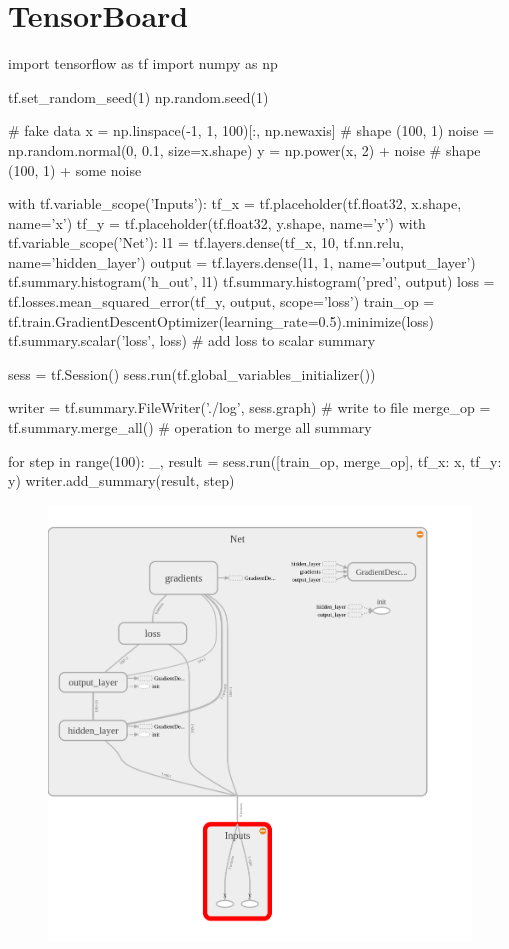 \section{TensorBoard}
\begin{python}
import tensorflow as tf
import numpy as np

tf.set_random_seed(1)
np.random.seed(1)

# fake data
x = np.linspace(-1, 1, 100)[:, np.newaxis]          # shape (100, 1)
noise = np.random.normal(0, 0.1, size=x.shape)
y = np.power(x, 2) + noise                          # shape (100, 1) + some noise

with tf.variable_scope('Inputs'):
        tf_x = tf.placeholder(tf.float32, x.shape, name='x')
        tf_y = tf.placeholder(tf.float32, y.shape, name='y')
with tf.variable_scope('Net'):
    l1 = tf.layers.dense(tf_x, 10, tf.nn.relu, name='hidden_layer')
    output = tf.layers.dense(l1, 1, name='output_layer')
    tf.summary.histogram('h_out', l1)
    tf.summary.histogram('pred', output)
    loss = tf.losses.mean_squared_error(tf_y, output, scope='loss')
    train_op = tf.train.GradientDescentOptimizer(learning_rate=0.5).minimize(loss)
    tf.summary.scalar('loss', loss)     # add loss to scalar summary

    sess = tf.Session()
    sess.run(tf.global_variables_initializer())

    writer = tf.summary.FileWriter('./log', sess.graph)     # write to file
    merge_op = tf.summary.merge_all()                       # operation to merge all summary

    for step in range(100):
        _, result = sess.run([train_op, merge_op], {tf_x: x, tf_y: y})
        writer.add_summary(result, step)
\end{python}
\begin{figure}[H]
	\includegraphics[scale=0.4]{./pic/chapter1/tenbor1.png}
\end{figure}

